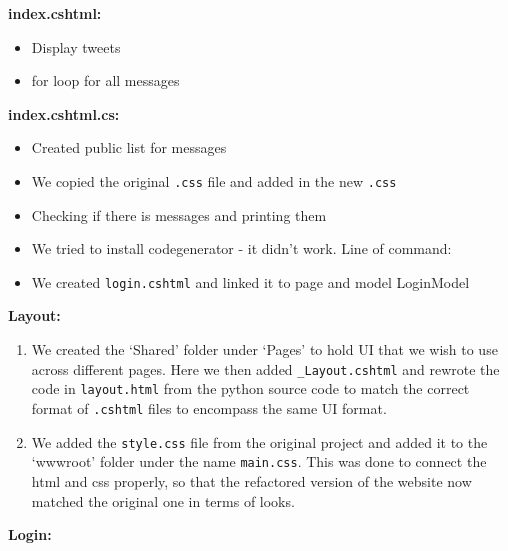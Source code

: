 \textbf{index.cshtml:}

\begin{itemize}
    \item Display tweets
    \item for loop for all messages
\end{itemize}

\textbf{index.cshtml.cs:}

\begin{itemize}
    \item Created public list for messages
    \item We copied the original \texttt{.css} file and added in the new \texttt{.css}
    \item Checking if there is messages and printing them
    \item We tried to install codegenerator - it didn't work. Line of command:
    \item We created \texttt{login.cshtml} and linked it to page and model LoginModel
\end{itemize}

\textbf{Layout:}

\begin{enumerate}
    \item We created the `Shared' folder under `Pages' to hold UI that we wish to use across different pages. Here we then added \texttt{\_Layout.cshtml} and rewrote the code in \texttt{layout.html} from the python source code to match the correct format of \texttt{.cshtml} files to encompass the same UI format.
    \item We added the \texttt{style.css} file from the original project and  added it to the `wwwroot' folder under the name \texttt{main.css}.  This was done to connect the html and css properly, so that the refactored version of the website now matched the original one in terms of looks.
\end{enumerate}

\textbf{Login:}

